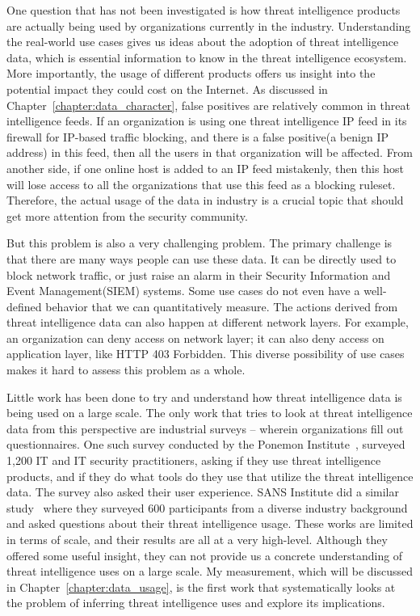 One question that has not been investigated is how threat intelligence 
products are actually being used by organizations currently in the industry.
Understanding the real-world use cases gives us ideas about the adoption of threat
intelligence data, which is essential information to know in the threat
intelligence ecosystem. More importantly, the usage of different products offers
us insight into the potential impact they could cost on the Internet. As 
discussed in Chapter~\ref{chapter:data_character}, false positives are relatively 
common in threat intelligence feeds. If an organization is using one threat
intelligence IP feed in its firewall for IP-based traffic blocking, and there
is a false positive(a benign IP address) in this feed, then all the users in
that organization will be affected. From another side, if one online host is
added to an IP feed mistakenly, then this host will lose access to all the
organizations that use this feed as a blocking ruleset. Therefore, the actual
usage of the data in industry is a crucial topic that should get more attention
from the security community.

But this problem is also a very challenging problem. The primary challenge 
is that there are many ways people can use these data. It can be directly 
used to block network traffic, or just raise an alarm in their Security
Information and Event Management(SIEM) systems. Some use cases do not even 
have a well-defined behavior that we can quantitatively measure. 
The actions derived from threat intelligence data can also happen at different
network layers. For example, an organization can deny access on network layer; 
it can also deny access on application layer, like HTTP 403 Forbidden. 
This diverse possibility of use cases makes it hard to assess this problem as 
a whole. 

Little work has been done to try and understand how threat
intelligence data is being used on a large scale. The only work that tries to
look at threat intelligence data from this perspective are industrial surveys
-- wherein organizations fill out questionnaires. One such survey conducted by
the Ponemon Institute~\cite{ponemon2018cti}, surveyed 1,200 IT and IT
security practitioners, asking if they use threat intelligence products, and
if they do what tools do they use that utilize the threat intelligence data.
The survey also asked their user experience. SANS Institute did a
similar study~\cite{shackleford2017cyber} where they surveyed 600
participants from a diverse industry background and asked questions about
their threat intelligence usage. These works are limited in terms
of scale, and their results are all at a very high-level. Although they offered
some useful insight, they can not provide us a concrete understanding
of threat intelligence uses on a large scale. My measurement,
which will be discussed in Chapter~\ref{chapter:data_usage},
is the first work that systematically looks at the problem of inferring
threat intelligence uses and explore its implications.
